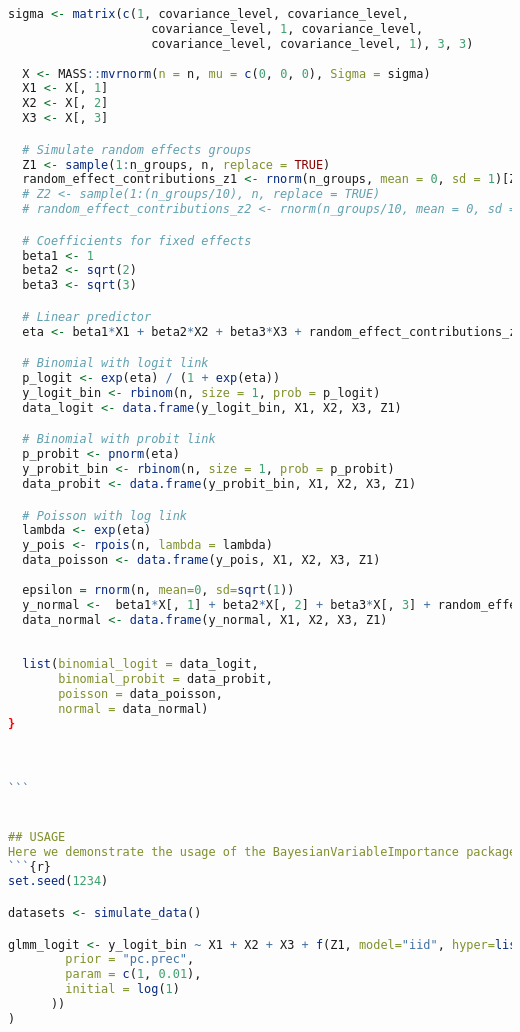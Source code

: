 \begin{lstlisting}[language=R, caption=Usage of the BayesianImpGLMM package with plots and examples.]
  sigma <- matrix(c(1, covariance_level, covariance_level, 
                    covariance_level, 1, covariance_level, 
                    covariance_level, covariance_level, 1), 3, 3)
  
  X <- MASS::mvrnorm(n = n, mu = c(0, 0, 0), Sigma = sigma)
  X1 <- X[, 1]
  X2 <- X[, 2]
  X3 <- X[, 3]

  # Simulate random effects groups
  Z1 <- sample(1:n_groups, n, replace = TRUE)
  random_effect_contributions_z1 <- rnorm(n_groups, mean = 0, sd = 1)[Z1]
  # Z2 <- sample(1:(n_groups/10), n, replace = TRUE)
  # random_effect_contributions_z2 <- rnorm(n_groups/10, mean = 0, sd = 1)[Z2]

  # Coefficients for fixed effects
  beta1 <- 1
  beta2 <- sqrt(2)
  beta3 <- sqrt(3)

  # Linear predictor
  eta <- beta1*X1 + beta2*X2 + beta3*X3 + random_effect_contributions_z1 #+ random_effect_contributions_z2 

  # Binomial with logit link
  p_logit <- exp(eta) / (1 + exp(eta))
  y_logit_bin <- rbinom(n, size = 1, prob = p_logit)
  data_logit <- data.frame(y_logit_bin, X1, X2, X3, Z1)

  # Binomial with probit link
  p_probit <- pnorm(eta)
  y_probit_bin <- rbinom(n, size = 1, prob = p_probit)
  data_probit <- data.frame(y_probit_bin, X1, X2, X3, Z1)

  # Poisson with log link
  lambda <- exp(eta)
  y_pois <- rpois(n, lambda = lambda)
  data_poisson <- data.frame(y_pois, X1, X2, X3, Z1)
  
  epsilon = rnorm(n, mean=0, sd=sqrt(1))
  y_normal <-  beta1*X[, 1] + beta2*X[, 2] + beta3*X[, 3] + random_effect_contributions_z1 + epsilon 
  data_normal <- data.frame(y_normal, X1, X2, X3, Z1)
  
  
  list(binomial_logit = data_logit, 
       binomial_probit = data_probit, 
       poisson = data_poisson, 
       normal = data_normal)
}



```


## USAGE
Here we demonstrate the usage of the BayesianVariableImportance package. We fit Bayesian binomial, Poisson and gaussian models and sample posterior distributions for different simulated datasets using functions from the package. Then, plots are made to display the results.
```{r}
set.seed(1234)

datasets <- simulate_data()

glmm_logit <- y_logit_bin ~ X1 + X2 + X3 + f(Z1, model="iid", hyper=list(prec = list(
        prior = "pc.prec",
        param = c(1, 0.01),
        initial = log(1)
      ))
)


\end{lstlisting}

